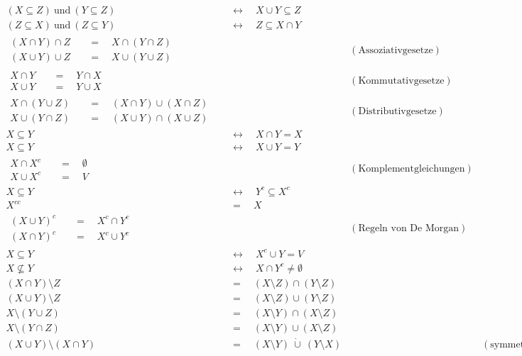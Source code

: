 \begin{align*}
    (X\subseteq Z) \ \text{und}\ (Y\subseteq Z)  & \quad \leftrightarrow\quad X\cup Y \subseteq Z  \\
    (Z\subseteq X) \ \text{und}\ (Z\subseteq Y) & \quad \leftrightarrow\quad Z \subseteq X\cap Y  \\[1em]
    \begin{split}
        (X \cap Y) \cap Z &  \quad = \quad  X \cap (Y \cap Z) \\
        (X \cup Y) \cup Z &  \quad = \quad  X \cup (Y \cup Z)
    \end{split} && (\text{Assoziativgesetze}) \\[1em]
    \begin{split}
        X \cap Y &  \quad = \quad  Y\cap X \\
        X \cup Y &  \quad = \quad  Y\cup X
    \end{split} && ( \text{Kommutativgesetze}) \\[1em]
    \begin{split}
        X \cap (Y \cup Z) &  \quad = \quad  (X\cap Y) \cup (X\cap Z) \\
        X \cup (Y\cap Z) &  \quad = \quad  (X\cup Y) \cap (X\cup Z)
    \end{split} && ( \text{Distributivgesetze}) \\[1em]
    X \subseteq Y & \quad \leftrightarrow\quad X\cap Y  =  X \\
    X \subseteq Y & \quad \leftrightarrow\quad X\cup Y = Y \\[1em]
    \begin{split}
        X \cap X^c & \quad = \quad  \emptyset \\
        X \cup X^c & \quad = \quad  V
    \end{split} && (\text{Komplementgleichungen}) \\[1em]
    X \subseteq Y & \quad \leftrightarrow\quad Y^c \subseteq X^c \\
    X^{cc} &  \quad = \quad  X \\[1em]
    \begin{split}
        (X\cup Y)^c &  \quad = \quad  X^c \cap Y^c \\
        (X\cap Y)^c &  \quad = \quad X^c \cup Y^c
    \end{split} && (\text{Regeln von De Morgan}) \\[1em]
    X \subseteq Y & \quad \leftrightarrow\quad X^c \cup Y = V \\
    X \nsubseteq Y & \quad \leftrightarrow\quad X\cap Y^c \neq \emptyset \\[1em]
    (X \cap Y) \setminus Z & \quad =\quad(X\setminus Z)\cap (Y\setminus Z) \\
    (X\cup Y)\setminus Z & \quad =\quad (X\setminus Z)\cup (Y\setminus Z) \\
        X \setminus (Y \cup Z) & \quad =\quad (X \setminus Y) \cap (X \setminus Z)\\
        X \setminus (Y \cap Z) & \quad =\quad (X \setminus Y) \cup (X \setminus Z) \\[1em]
    (X \cup Y) \setminus (X \cap Y) & \quad =\quad (X \setminus Y) \ \dot\cup\ (Y \setminus X) && (\text{symmetrische Differenz})
\end{align*}
